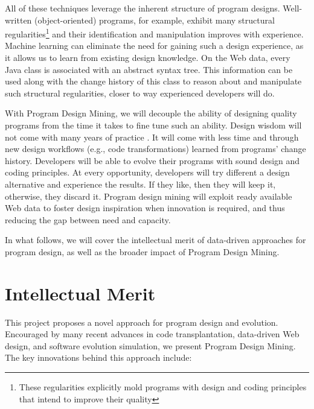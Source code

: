 All of these techniques leverage the inherent structure of program designs. 
Well-written (object-oriented) programs, for example, exhibit many structural 
regularities\footnote{These regularities explicitly mold programs with design 
and coding principles that intend to improve their quality} and their 
identification and manipulation improves with experience. Machine learning 
can eliminate the need for gaining such a design experience, as it allows us to learn 
from existing design knowledge. On the Web data, every Java class is associated 
with an abstract syntax tree. This information can be used along with the change 
history of this class to reason about and manipulate such structural regularities, 
closer to way experienced developers will do. 

With Program Design Mining, we will decouple the ability of designing quality 
programs from the time it takes to fine tune such an ability. Design wisdom 
will not come with many years of practice \cite{weiser1983programming, 
winslow1996programming}. It will come with less time and through new design 
workflows (e.g., code transformations) learned from programs' change 
history. Developers will be able to evolve their programs with sound design and 
coding principles. At every opportunity, developers will try different a design 
alternative and experience the results. If they like, then they will keep it, 
otherwise, they discard it. Program design mining will exploit ready available 
Web data to foster design inspiration when innovation is required, and thus 
reducing the gap between need and capacity.

In what follows, we will cover the intellectual merit of data-driven 
approaches for program design, as well as the broader impact of Program 
Design Mining.

\section*{Intellectual Merit} %
\label{sec:merit}

This project proposes a novel approach for program design and 
evolution. Encouraged by many recent advances in code transplantation, 
data-driven Web design, and software evolution simulation, we 
present Program Design Mining. The key innovations behind this 
approach include:

